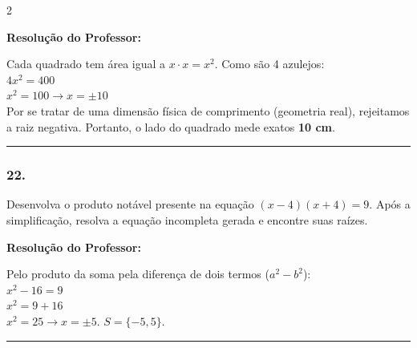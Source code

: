 \begin{multicols*}{2}
\ifgabarito
    \begin{tcolorbox}[colback=CorTitUm!5, colframe=CorTitUm, boxrule=1pt, arc=4pt, left=6pt, right=6pt, top=6pt, bottom=6pt]
    \small\textbf{\textcolor{CorTitUm}{Resolução do Professor:}}\par\vspace{0.1cm}
    \color{CinzaEscuro}
    Cada quadrado tem área igual a $x \cdot x = x^2$. Como são 4 azulejos:\\
    $4x^2 = 400$\\
    $x^2 = 100 \rightarrow x = \pm 10$\\
    Por se tratar de uma dimensão física de comprimento (geometria real), rejeitamos a raiz negativa. Portanto, o lado do quadrado mede exatos \textbf{10 cm}.
    \end{tcolorbox}
\fi

\par\vspace{\espacoQuestao}

\noindent\textcolor{CorLinha}{\rule{\linewidth}{0.5pt}} 
\par\vspace{\espacoPreQuestao}
\subsubsection*{22.} Desenvolva o produto notável presente na equação $ (x - 4)(x + 4) = 9 $. Após a simplificação, resolva a equação incompleta gerada e encontre suas raízes.

\ifgabarito
    \begin{tcolorbox}[colback=CorTitUm!5, colframe=CorTitUm, boxrule=1pt, arc=4pt, left=6pt, right=6pt, top=6pt, bottom=6pt]
    \small\textbf{\textcolor{CorTitUm}{Resolução do Professor:}}\par\vspace{0.1cm}
    \color{CinzaEscuro}
    Pelo produto da soma pela diferença de dois termos ($a^2 - b^2$):\\
    $x^2 - 16 = 9$\\
    $x^2 = 9 + 16$\\
    $x^2 = 25 \rightarrow x = \pm 5$. $S = \{-5, 5\}$.
    \end{tcolorbox}
\fi

\par\vspace{\espacoQuestao}

\noindent\textcolor{CorLinha}{\rule{\linewidth}{0.5pt}} 
\par\vspace{\espacoPreQuestao}

\end{multicols*}
